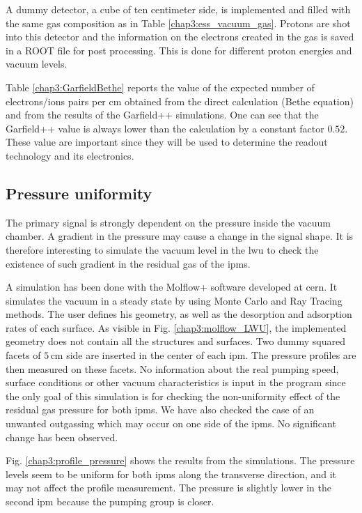 \begin{refsection}
  
  A dummy detector, a cube of ten centimeter side, is implemented and filled with the same gas composition as in Table \ref{chap3:ess_vacuum_gas}. Protons are shot into this detector and the information on the electrons created in the gas is saved in a ROOT file \cite{Brun1997,Antcheva2009} for post processing. This is done for different proton energies and vacuum levels.

  Table \ref{chap3:GarfieldBethe} reports the value of the expected number of electrons/ions pairs per cm obtained from the direct calculation (Bethe equation) and from the results of the Garfield++ simulations. One can see that the Garfield++ value is always lower than the calculation by a constant factor $0.52$. These value are important since they will be used to determine the readout technology and its electronics.

  \subsection{Pressure uniformity}
  The primary signal is strongly dependent on the pressure inside the vacuum chamber. A gradient in the pressure may cause a change in the signal shape. It is therefore interesting to simulate the vacuum level in the \acrshort{lwu} to check the existence of such gradient in the residual gas of the \acrshort{ipm}s.

  
  A simulation has been done with the Molflow+ software developed at \acrshort{cern}\cite{Kersevan2009}. It simulates the vacuum in a steady state by using Monte Carlo and Ray Tracing methods. The user defines his geometry, as well as the desorption and adsorption rates of each surface. As visible in Fig. \ref{chap3:molflow_LWU}, the implemented geometry does not contain all the structures and surfaces. Two dummy squared facets of $5\,\mathrm{cm}$ side are inserted in the center of each \acrshort{ipm}. The pressure profiles are then measured on these facets. No information about the real pumping speed, surface conditions or other vacuum characteristics is input in the program since the only goal of this simulation is for checking the non-uniformity effect of the residual gas pressure for both \acrshort{ipm}s. We have also checked the case of an unwanted outgassing which may occur on one side of the \acrshort{ipm}s. No significant change has been observed.

  Fig. \ref{chap3:profile_pressure} shows the results from the simulations. The pressure levels seem to be uniform for both \acrshort{ipm}s along the transverse direction, and it may not affect the profile measurement. The pressure is slightly lower in the second \acrshort{ipm} because the pumping group is closer.


\end{refsection}
